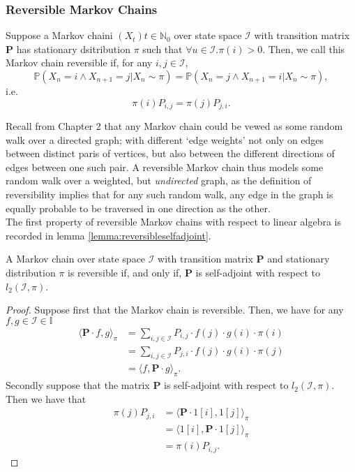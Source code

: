 	\subsubsection{Reversible Markov Chains}
	\begin{definition}
		Suppose a Markov chaini $(X_t){t\in\mathbb{N}_0}$ over state space $\mathcal{I}$ 
		with transition matrix $\mathbf{P}$ has stationary dsitribution $\pi$ such that 
		$\forall u\in\mathcal{I} 
		. \pi(i) > 0$. Then, we call this Markov chain reversible if, for any $i,j \in
		\mathcal{I}$,
		$$
			\mathbb{P}(X_n = i \land X_{n+1} = j | X_n \sim \pi) 
			= 
			\mathbb{P}(X_n = j \land X_{n+1} = i | X_n \sim \pi),
		$$
		i.e.\ 
		$$
			\pi(i) P_{i, j} = \pi(j) P_{j,i}.
		$$
	\end{definition}
	
	Recall from Chapter 2 that any Markov chain could be vewed as some random walk over a 
	directed graph; with different `edge weights' not only on edges between distinct paris of 
	vertices, but also between the different directions of edges between one such pair. A 
	reversible Markov chain thus models some random walk over a weighted, but \emph{undirected} 
	graph, as the definition of reversibility implies that for any such random walk, any edge 
	in the graph is equally probable to be traversed in one direction as the other.\\
	The first property of reversible Markov chains with respect to linear algebra is recorded 
	in lemma \ref{lemma:reversibleselfadjoint}.
	\begin{lemma}
		\label{lemma:reversibleselfadjoint}
		A Markov chain over state space $\mathcal{I}$ with transition matrix $\mathbf{P}$ 
		and stationary distribution $\pi$ is reversible if, and only if,
		$\mathbf{P}$ is self-adjoint with respect to $l_2(\mathcal{I},\pi)$.
	\end{lemma}
	\begin{proof}
		Suppose first that the Markov chain is reversible. 
		Then, we have for any $f,g \in \mathcal{I} \in \mathbb{I}$
		\begin{align*}
			\langle \mathbf{P}\cdot f, g\rangle_\pi 
			&= \sum_{i,j\in \mathcal{I}} 
			P_{i,j}\cdot f(j) \cdot g(i) \cdot \pi(i)\\
			&= \sum_{i,j\in \mathcal{I}} 
			P_{j,i}\cdot f(j) \cdot g(i) \cdot \pi(j)\\
			&= \langle f, \mathbf{P}\cdot g\rangle_\pi.
		\end{align*}
		Secondly suppose that the matrix $\mathbf{P}$ is self-adjoint with respect to 
		$l_2(\mathcal{I}, \pi)$. Then we have that
		\begin{align*}
			\pi(j)P_{j,i} &= \langle \mathbf{P}\cdot 1[i], 1[j]\rangle_\pi\\
			&= \langle 1[i], \mathbf{P}\cdot1[j] \rangle_\pi \\
			&= \pi(i)P_{i,j}.
		\end{align*}
	\end{proof}

